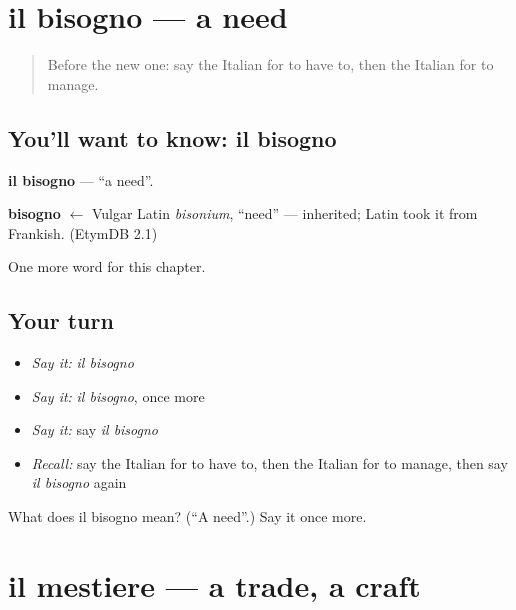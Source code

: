 \section[il bisogno]{il bisogno — a need}

\label{lesson:IT-C85-bisogno}



\begin{quote}
Before the new one: say the Italian for to have to, then the Italian for to manage.
\end{quote}

\subsection*{You'll want to know: il bisogno}
\textbf{il bisogno} — \textquotedblleft{}a need\textquotedblright{}.

\begin{cousinweb}
\textbf{bisogno} $\leftarrow$ Vulgar Latin \emph{bisonium}, \textquotedblleft{}need\textquotedblright{} — inherited; Latin took it from Frankish. (EtymDB 2.1)
\end{cousinweb}

\begin{grammarlens}[title={What you've built}]
One more word for this chapter.
\end{grammarlens}

\subsection*{Your turn}
\begin{itemize}
\raggedright
  \item \emph{Say it:} \emph{il bisogno}
  \item \emph{Say it:} \emph{il bisogno}, once more
  \item \emph{Say it:} say \emph{il bisogno}
  \item \emph{Recall:} say the Italian for to have to, then the Italian for to manage, then say \emph{il bisogno} again
\end{itemize}

\begin{tcolorbox}[breakable,colback=teal!4,colframe=teal!35!black,title={Before you move on}]
What does il bisogno mean? (\textquotedblleft{}A need\textquotedblright{}.) Say it once more.
\end{tcolorbox}
\section[il mestiere]{il mestiere — a trade, a craft}

